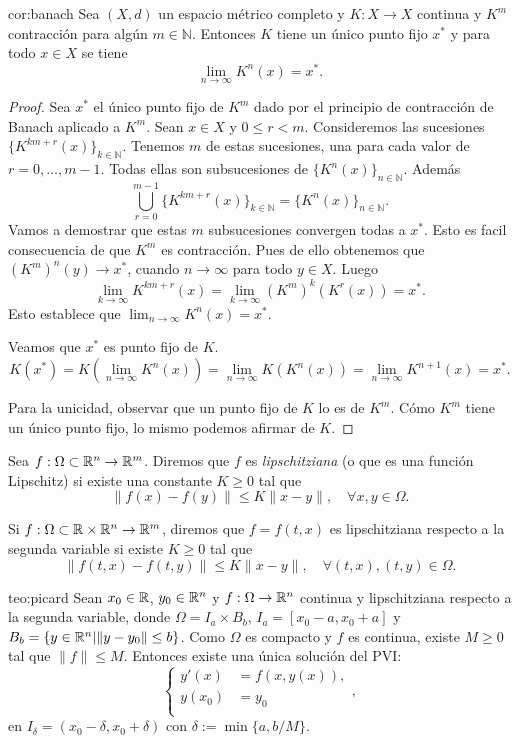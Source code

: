 \begin{corolario}{cor:banach}  Sea $(X,d)$ un espacio métrico completo y $K:X\to X$ continua y $K^m$ contracción para algún $m\in\mathbb{N}$. Entonces $K$ tiene un único punto fijo $x^*$ y para todo $x\in X$ se tiene
\[ \lim_{n\to\infty} K^n(x)=x^*.\]
 \end{corolario}
 
 \begin{proof} Sea $x^*$ el único punto fijo de $K^m$ dado por el principio de contracción de Banach aplicado a $K^m$. Sean $x\in X$ y $0\leq r<m$. Consideremos las sucesiones $\{K^{km+r}(x)\}_{k\in\mathbb{N}}$. Tenemos $m$ de estas sucesiones, una para cada valor de $r=0,\ldots,m-1$. Todas ellas son subsucesiones de $\{K^n(x)\}_{n\in\mathbb{N}}$. Además 
  \[\bigcup_{r=0}^{m-1}\{K^{km+r}(x)\}_{k\in\mathbb{N}}=\{K^n(x)\}_{n\in\mathbb{N}}.\]
  Vamos a demostrar que estas $m$ subsucesiones convergen todas a $x^*$. Esto es facil consecuencia de que $K^m$ es contracción. Pues de ello obtenemos que $\left(K^{m}\right)^n(y)\to x^*$, cuando $n\to\infty$ para todo $y\in X$. Luego
  \[\lim_{k\to\infty}K^{km+r}(x)=\lim_{k\to\infty}\left(K^{m}\right)^k(K^r(x))=x^*.\]
  Esto establece que $ \lim_{n\to\infty} K^n(x)=x^*$.
  
  Veamos que $x^*$ es punto fijo de $K$. 
  \[K(x^*)=K\left(\lim_{n\to\infty} K^{n}(x)\right)=\lim_{n\to\infty} K\left( K^{n}(x)\right)
  =\lim_{n\to\infty}  K^{n+1}(x)=x^*.\]
  
  Para la unicidad, observar que un punto fijo de $K$ lo es de $K^m$. Cómo $K^m$ tiene un único punto fijo, lo mismo podemos afirmar de $K$.
  
 \end{proof}


\begin{definicion} Sea $f:\Omega \subset \rr^n\to \rr^m$. Diremos que $f$ es \emph{lipschitziana} (o que es una función Lipschitz) si existe una constante $K\geq 0$ tal que
\[\|f(x)-f(y)\|\leq K\|x-y\|,\quad \forall x,y\in \Omega .\]

Si $f:\Omega\subset\rr\times \rr^n\to\rr^m$, diremos que $f=f(t,x)$ es lipschitziana respecto a la segunda variable si existe  $K\geq 0$ tal que
\[\|f(t,x)-f(t,y)\|\leq K\|x-y\|,\quad \forall (t,x),(t,y)\in \Omega .\]
 
\end{definicion}



\begin{teorema}{teo:picard} Sean $x_0\in\rr$, $y_0\in\rr^n$ y $f:\Omega\to\rr^n$ continua y lipschitziana respecto a la segunda variable, donde $\Omega=I_a\times B_b$,  $I_a=[x_0-a,x_0+a]$ y $B_b=\{y\in\rr^n|\|y-y_0\|\leq b\}$. Como $\Omega$ es compacto y $f$ es continua, existe $M\geq 0$ tal que $\|f\|\leq M$. Entonces existe una única solución del PVI:
\[
 \left\{\begin{array}{ll}
	  y'(x)&=f(x,y(x)),\\
	  y(x_0)&=y_0\\         
        \end{array}
\right. ,
\]
en $I_{\delta}=(x_0-\delta,x_0+\delta)$ con $\delta:=\min\{a,b/M\}$.
 \end{teorema}

